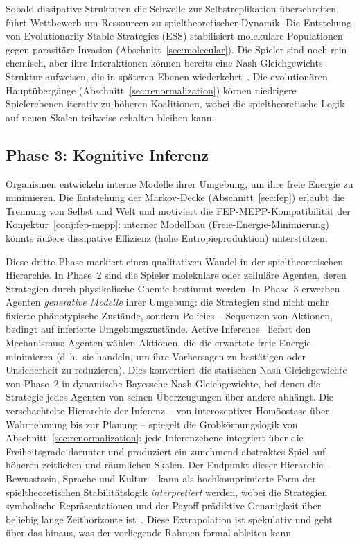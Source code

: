 \documentclass[12pt,a4paper]{article}
\theoremstyle{remark}
\begin{document}
Sobald dissipative Strukturen die Schwelle zur Selbstreplikation überschreiten, führt Wettbewerb um Ressourcen zu spieltheoretischer Dynamik. Die Entstehung von Evolutionarily Stable Strategies (ESS) stabilisiert molekulare Populationen gegen parasitäre Invasion (Abschnitt~\ref{sec:molecular}). Die \glqq Spieler\grqq{} sind noch rein chemisch, aber ihre Interaktionen können bereits eine Nash-Gleichgewichts-Struktur aufweisen, die in späteren Ebenen wiederkehrt~\citep{MaynardSmithPrice1973}. Die evolutionären Hauptübergänge (Abschnitt~\ref{sec:renormalization}) körnen niedrigere Spielerebenen iterativ zu höheren Koalitionen, wobei die spieltheoretische Logik auf neuen Skalen teilweise erhalten bleiben kann.

\subsection{Phase 3: Kognitive Inferenz}

Organismen entwickeln interne Modelle ihrer Umgebung, um ihre freie Energie zu minimieren. Die Entstehung der Markov-Decke (Abschnitt~\ref{sec:fep}) erlaubt die Trennung von Selbst und Welt und motiviert die FEP-MEPP-Kompatibilität der Konjektur~\ref{conj:fep-mepp}: interner Modellbau (Freie-Energie-Minimierung) könnte äußere dissipative Effizienz (hohe Entropieproduktion) unterstützen.

Diese dritte Phase markiert einen qualitativen Wandel in der spieltheoretischen Hierarchie. In Phase~2 sind die \glqq Spieler\grqq{} molekulare oder zelluläre Agenten, deren Strategien durch physikalische Chemie bestimmt werden. In Phase~3 erwerben Agenten \emph{generative Modelle} ihrer Umgebung: die Strategien sind nicht mehr fixierte phänotypische Zustände, sondern Policies -- Sequenzen von Aktionen, bedingt auf inferierte Umgebungszustände. Active Inference~\citep{FristonFreeEnergy} liefert den Mechanismus: Agenten wählen Aktionen, die die erwartete freie Energie minimieren (d.\,h.\ sie handeln, um ihre Vorhersagen zu bestätigen oder Unsicherheit zu reduzieren). Dies konvertiert die statischen Nash-Gleichgewichte von Phase~2 in dynamische Bayessche Nash-Gleichgewichte, bei denen die Strategie jedes Agenten von seinen Überzeugungen über andere abhängt. Die verschachtelte Hierarchie der Inferenz -- von interozeptiver Homöostase über Wahrnehmung bis zur Planung -- spiegelt die Grobkörnungslogik von Abschnitt~\ref{sec:renormalization}: jede Inferenzebene integriert über die Freiheitsgrade darunter und produziert ein zunehmend abstraktes Spiel auf höheren zeitlichen und räumlichen Skalen. Der Endpunkt dieser Hierarchie -- Bewusstsein, Sprache und Kultur -- kann als hochkomprimierte Form der spieltheoretischen Stabilitätslogik \emph{interpretiert} werden, wobei die \glqq Strategien\grqq{} symbolische Repräsentationen und der \glqq Payoff\grqq{} prädiktive Genauigkeit über beliebig lange Zeithorizonte ist~\citep{FristonPDF}. Diese Extrapolation ist spekulativ und geht über das hinaus, was der vorliegende Rahmen formal ableiten kann.
\end{document}
